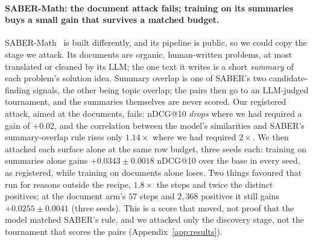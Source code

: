 \paragraph{SABER-Math: the document attack fails; training on its summaries buys a small gain that survives a matched budget.}
SABER-Math~\citep{georgiev2026saber} is built differently, and its pipeline is public, so we could copy the stage we attack. Its documents are organic, human-written problems, at most translated or cleaned by its LLM; the one text it writes is a short \emph{summary} of each problem's solution idea. Summary overlap is one of SABER's two candidate-finding signals, the other being topic overlap; the pairs then go to an LLM-judged tournament, and the summaries themselves are never scored. Our registered attack, aimed at the documents, fails: nDCG@10 \emph{drops} where we had required a gain of $+0.02$, and the correlation between the model's similarities and SABER's summary-overlap rule rises only $1.14\times$ where we had required $2\times$. We then attacked each surface alone at the same row budget, three seeds each: training on summaries alone gains $+0.0343 \pm 0.0018$ nDCG@10 over the base in every seed, as registered, while training on documents alone loses. Two things favoured that run for reasons outside the recipe, $1.8\times$ the steps and twice the distinct positives; at the document arm's $57$ steps and $2{,}368$ positives it still gains $+0.0255 \pm 0.0041$ (three seeds). This is a score that moved, not proof that the model matched SABER's rule, and we attacked only the discovery stage, not the tournament that scores the pairs (Appendix~\ref{app:results}).


